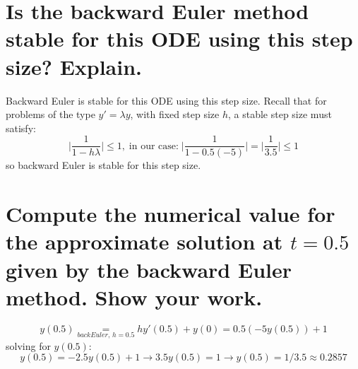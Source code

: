 \documentclass[letterpaper,10pt]{article}
\newcommand{\be}{\begin{equation}}
\newcommand{\ee}{\end{equation}}
\begin{document}
\section*{Is the backward Euler method stable for this ODE using this step size? Explain.}
Backward Euler is stable for this ODE using this step size. Recall that for problems of the type $y' = \lambda y$, with fixed step size $h$, a stable step size must satisfy:
\be \lvert \frac{1}{1-h\lambda} \rvert \leq 1, \; \text{in our case:} \;  \lvert \frac{1}{1-0.5(-5)} \rvert =  \lvert \frac{1}{3.5} \rvert \leq 1 \ee
so backward Euler is stable for this step size.

\section*{Compute the numerical value for the approximate solution at $t=0.5$ given by the backward Euler method. Show your work.}
\be y(0.5) \underset{backEuler, \,h=0.5}{=} hy'(0.5)+y(0) = 0.5(-5y(0.5))+1 \ee
solving for $y(0.5)$:
\be y(0.5) = -2.5y(0.5)+1 \rightarrow 3.5y(0.5)=1 \rightarrow y(0.5) = 1/3.5 \approx 0.2857\ee
\end{document}
